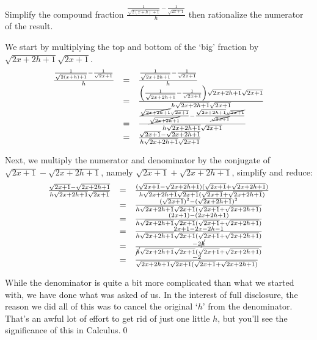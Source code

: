 \documentclass{ximera}
\begin{document}
\begin{example} \label{rationalizenumdenombosslevel}

Simplify the compound fraction $\frac{\frac{1}{\sqrt{2(x+h)+1}} - \frac{1}{\sqrt{2x+1}}}{h}$ then rationalize the numerator of the result.

\begin{explanation}
We start by multiplying the top and bottom of the `big' fraction by $\sqrt{2x+2h+1} \sqrt{2x+1}$.  \[ \begin{array}{rcl}

\frac{\frac{1}{\sqrt{2(x+h)+1}} - \frac{1}{\sqrt{2x+1}}}{h} & = & \frac{\frac{1}{\sqrt{2x+2h+1}} - \frac{1}{\sqrt{2x+1}}}{h}\\ 
& = & \frac{\left(\frac{1}{\sqrt{2x+2h+1}} - \frac{1}{\sqrt{2x+1}}\right) \sqrt{2x+2h+1} \sqrt{2x+1}}{h\sqrt{2x+2h+1} \sqrt{2x+1}}\\ 
& = & \frac{\frac{\cancel{\sqrt{2x+2h+1}}\sqrt{2x+1}}{\cancel{\sqrt{2x+2h+1}}} - \frac{\sqrt{2x+2h+1} \cancel{\sqrt{2x+1}}}{\cancel{\sqrt{2x+1}}}}{h\sqrt{2x+2h+1} \sqrt{2x+1}}\\ 
& = & \frac{\sqrt{2x + 1}- \sqrt{2x+2h+1}}{h\sqrt{2x+2h+1} \sqrt{2x+1}}\\	
\end{array}\]
												
Next, we multiply the numerator and denominator by the conjugate of $\sqrt{2x+1} - \sqrt{2x+2h+1}$, namely $\sqrt{2x+1} + \sqrt{2x+2h+1}$, simplify and reduce:\[\begin{array}{rcl}

 \frac{\sqrt{2x + 1}- \sqrt{2x+2h+1}}{h\sqrt{2x+2h+1} \sqrt{2x+1}} & = & \frac{(\sqrt{2x+1} - \sqrt{2x+2h+1})(\sqrt{2x+1} + \sqrt{2x+2h+1})}{h\sqrt{2x+2h+1} \sqrt{2x+1}(\sqrt{2x+1} + \sqrt{2x+2h+1})} \\  

 & = & \frac{(\sqrt{2x+1})^2 - (\sqrt{2x+2h+1})^2}{h\sqrt{2x+2h+1} \sqrt{2x+1}(\sqrt{2x+1} + \sqrt{2x+2h+1})} \\ 

 & = & \frac{(2x+1) - (2x+2h+1)}{h\sqrt{2x+2h+1} \sqrt{2x+1}(\sqrt{2x+1} + \sqrt{2x+2h+1})} \\ 

& = & \frac{2x+1 -2x-2h-1}{h\sqrt{2x+2h+1} \sqrt{2x+1}(\sqrt{2x+1} + \sqrt{2x+2h+1})} \\ 

& = & \frac{-2\cancel{h}}{\cancel{h}\sqrt{2x+2h+1} \sqrt{2x+1}(\sqrt{2x+1} + \sqrt{2x+2h+1})} \\ 
& = & \frac{-2}{\sqrt{2x+2h+1} \sqrt{2x+1}(\sqrt{2x+1} + \sqrt{2x+2h+1})} \\
\end{array}\] 

While the denominator is quite a bit more complicated than what we started with, we have done what was asked of us.  In the interest of full disclosure, the reason we did all of this was to cancel the original `$h$' from the denominator. That's an awful lot of effort to get rid of just one little $h$, but you'll see the significance of this in Calculus.\qed
\end{explanation}
\end{example}



\closegraphsfile
\end{document}
